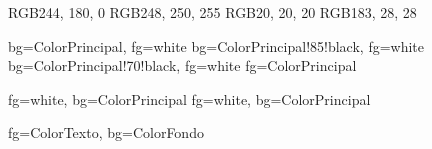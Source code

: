 %


\usepackage{xcolor}
\definecolor{ColorAcento}   {RGB}{244, 180,   0}  %
\definecolor{ColorFondo}    {RGB}{248, 250, 255}  %
\definecolor{ColorTexto}    {RGB}{20,  20,  20}   %
\definecolor{ColorAlerta}   {RGB}{183, 28,  28}   %


\usepackage[utf8]{inputenc}
\usepackage[T1]{fontenc}
\usepackage[spanish,es-tabla,es-nodecimaldot]{babel}
\usepackage{csquotes}
\usepackage{microtype}
\usepackage{lmodern}       %



   {bg=ColorPrincipal, fg=white}
 {bg=ColorPrincipal!85!black, fg=white}
  {bg=ColorPrincipal!70!black, fg=white}
         {fg=ColorPrincipal}

      {fg=white, bg=ColorPrincipal}
 {fg=white, bg=ColorPrincipal}

 {fg=ColorTexto, bg=ColorFondo}


